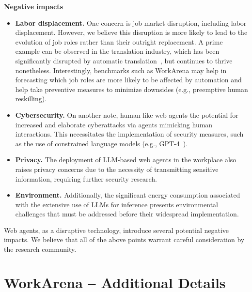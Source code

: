 \documentclass{article}
\theoremstyle{plain}
\theoremstyle{definition}
\theoremstyle{remark}
\newcommand{\paragraphtight}[1]{\textbf{#1~}}
\begin{document}
\paragraphtight{Negative impacts} 
\begin{itemize}
    \item \textbf{Labor displacement.} One concern is job market disruption, including labor displacement. However, we believe this disruption is more likely to lead to the evolution of job roles rather than their outright replacement. A prime example can be observed in the translation industry, which has been significantly disrupted by automatic translation~\citet{VanDerMeer2021}, but continues to thrive nonetheless. Interestingly, benchmarks such as WorkArena may help in forecasting which job roles are more likely to be affected by automation and help take preventive measures to minimize downsides (e.g., preemptive human reskilling).
    \item \textbf{Cybersecurity.} On another note, human-like web agents the potential for increased and elaborate cyberattacks via agents mimicking human interactions. This necessitates the implementation of security measures, such as the use of constrained language models (e.g., GPT-4~\citep{OpenAI2023GPT4TR}).
    \item \textbf{Privacy.} The deployment of LLM-based web agents in the workplace also raises privacy concerns due to the necessity of transmitting sensitive information, requiring further security research.
    \item \textbf{Environment.} Additionally, the significant energy consumption associated with the extensive use of LLMs for inference presents environmental challenges that must be addressed before their widespread implementation.
\end{itemize}

Web agents, as a disruptive technology, introduce several potential negative impacts. We believe that all of the above points warrant careful consideration by the research community.






\newpage
\appendix

\onecolumn

\section{WorkArena -- Additional Details}\label{app:workarena}
\end{document}
